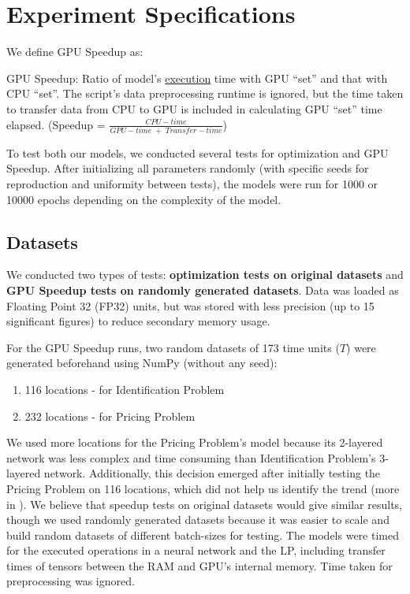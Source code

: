 \chapter{Experiment Specifications} \label{sec:Experiment Specifications}
We define GPU Speedup as:
\begin{mydef} \label{def:GPU Speedup}
    GPU Speedup: Ratio of model's \underline{execution} time with GPU ``set'' and that with CPU ``set''. The script's data preprocessing runtime is ignored, but the time taken to transfer data from CPU to GPU is included in calculating GPU ``set'' time elapsed. (Speedup = $\frac{CPU-time}{GPU-time\; +\; Transfer-time}$)
\end{mydef}

To test both our models, we conducted several tests for optimization and GPU Speedup. After initializing all parameters randomly (with specific seeds for reproduction and uniformity between tests), the models were run for 1000 or 10000 epochs depending on the complexity of the model.

\section{Datasets} \label{sec:Datasets}
We conducted two types of tests: \textbf{optimization tests on original datasets} and \textbf{GPU Speedup tests on randomly generated datasets}. Data was loaded as Floating Point 32 (FP32) units, but was stored with less precision (up to 15 significant figures) to reduce secondary memory usage.

For the GPU Speedup runs, two random datasets of 173 time units ($T$) were generated beforehand using NumPy (without any seed):
\begin{enumerate} 
    \item 116 locations - for Identification Problem
    \item 232 locations - for Pricing Problem
\end{enumerate}

We used more locations for the Pricing Problem's model because its 2-layered network was less complex and time consuming than Identification Problem's 3-layered network. Additionally, this decision emerged after initially testing the Pricing Problem on 116 locations, which did not help us identify the trend (more in ). We believe that speedup tests on original datasets would give similar results, though we used randomly generated datasets because it was easier to scale and build random datasets of different batch-sizes for testing. The models were timed for the executed operations in a neural network and the LP, including transfer times of tensors between the RAM and GPU's internal memory. Time taken for preprocessing was ignored. 

